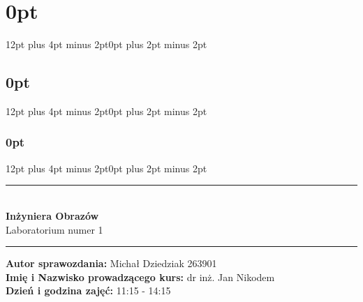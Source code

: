 % 
% 

\usepackage[margin = 0.7in]{geometry}
\usepackage{graphicx}
\usepackage{graphics}
\usepackage[T1]{fontenc}
\usepackage[polish]{babel}
\usepackage{cmap}
\usepackage[utf8]{inputenc}
\usepackage{float}
\usepackage{tabularx}
\usepackage[table,xcdraw]{xcolor}
\usepackage{lipsum}
\usepackage{titlesec}
\usepackage{minted}
\usepackage{xcolor}
\usepackage{caption}
\usepackage{enumitem}
\usepackage{csvsimple}
\usepackage{natbib}
\usepackage{blindtext}

\usepackage{amsmath} %

\usepackage{numprint} %
\usepackage[round-precision=3,round-mode=figures, scientific-notation=true]{siunitx} %

\usepackage[hidelinks]{hyperref}
\usepackage{url}

\usepackage{bm} %


\usepackage[]{booktabs}
\usepackage{tabularray}
\usepackage{multirow}

\author{Michał Dziedziak}
\date{\today}


\titlespacing\section{0pt}{12pt plus 4pt minus 2pt}{0pt plus 2pt minus 2pt}
\titlespacing\subsection{0pt}{12pt plus 4pt minus 2pt}{0pt plus 2pt minus 2pt}
\titlespacing\subsubsection{0pt}{12pt plus 4pt minus 2pt}{0pt plus 2pt minus 2pt}
\setlength{\parskip}{\baselineskip}%
\setlength{\parindent}{0pt}%

\newcommand{\squeezeup}{\vspace{-5mm}}




\begin{titlepage}
    \begin{center}
        \vspace*{5cm}
        \rule{500pt}{1pt}\\
        \vspace*{0.5cm}
        \LARGE
        \textbf{Inżyniera Obrazów}\\
        \Large
        Laboratorium numer 1
        \vspace*{0.5cm}
        \rule{500pt}{1pt}
    \end{center}

    \vspace*{10cm}

    {\raggedright
        \large
        \textbf{Autor sprawozdania:} Michał Dziedziak 263901\\
        \textbf{Imię i Nazwisko prowadzącego kurs:} dr inż. Jan Nikodem\\
        \textbf{Dzień i godzina zajęć:} 11:15 - 14:15
    }
\end{titlepage}


